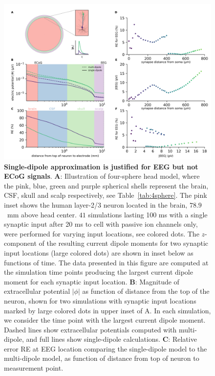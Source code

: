 \documentclass[preprint,10pt,authoryear]{elsarticle}
\newcommand{\hlg}[2][Emerald]{ {\sethlcolor{#1} \hl{#2}} }
\newcommand{\hlp}[2][Purple]{ {\sethlcolor{#1} \hl{#2}} }
\newcommand{\sntxt}[1]{{\color{NavyBlue}#1}}
\newcommand{\tvnnote}[1]{\color{white}{\hlg{TVN: #1 }}\color{black}}
\newcommand{\gen}[1]{\color{white}{\hlp{GTE: #1 }}\color{black}}
\begin{document}
\begin{figure}[H]
	\centering
	\includegraphics[width=1.0\textwidth]{figure2_eeg.png}
	\caption{\textbf{Single-dipole approximation is justified for EEG but not ECoG signals}. 
		\textbf{A}: Illustration of four-sphere head model, where the pink, blue, green and purple spherical shells represent the brain, CSF, skull and scalp respectively, see Table~\ref{tab:4sphere}. The pink inset shows the human layer-2/3 neuron \citep{EYAL2016} \sntxt{located in the brain, $78.9$~\si{mm} above head center}. $41$ simulations lasting 100 ms with a single synaptic input after 20 ms to cell with passive ion channels only, were performed for varying input locations, see colored dots. %
		The $z$-component of the resulting current dipole moments for two synaptic input locations (large colored dots) are shown in inset below as functions of time. The data presented in this figure are computed at the simulation time points producing the largest current dipole moment for each synaptic input location.
		\textbf{B}: Magnitude of extracellular potential $|\phi|$ as function of distance from the top of the neuron, shown for two simulations with synaptic input locations marked by large colored dots in upper inset of A. In each simulation, we consider the time point with the largest current dipole moment. Dashed lines show extracellular potentials computed with multi-dipole, and full lines show single-dipole calculations.
		\textbf{C}: Relative error RE at EEG location comparing the single-dipole model to the multi-dipole model, as function of distance from top of neuron to measurement point.
}
\end{figure}
\end{document}
